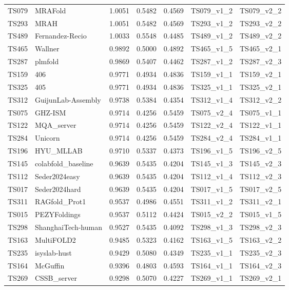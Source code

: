\begin{table}[ht]
{\begin{tabular}{llrrrll}
TS079 & MRAFold & 1.0051 & 0.5482 & 0.4569 & TS079\_v1\_2 & TS079\_v2\_2 \\ 
TS293 & MRAH & 1.0051 & 0.5482 & 0.4569 & TS293\_v1\_2 & TS293\_v2\_2 \\ 
TS489 & Fernandez-Recio & 1.0033 & 0.5548 & 0.4485 & TS489\_v1\_2 & TS489\_v2\_2 \\ 
TS465 & Wallner & 0.9892 & 0.5000 & 0.4892 & TS465\_v1\_5 & TS465\_v2\_1 \\ 
TS287 & plmfold & 0.9869 & 0.5407 & 0.4462 & TS287\_v1\_2 & TS287\_v2\_3 \\ 
TS159 & 406 & 0.9771 & 0.4934 & 0.4836 & TS159\_v1\_1 & TS159\_v2\_1 \\ 
TS325 & 405 & 0.9771 & 0.4934 & 0.4836 & TS325\_v1\_1 & TS325\_v2\_1 \\ 
TS312 & GuijunLab-Assembly & 0.9738 & 0.5384 & 0.4354 & TS312\_v1\_4 & TS312\_v2\_2 \\ 
TS075 & GHZ-ISM & 0.9714 & 0.4256 & 0.5459 & TS075\_v2\_4 & TS075\_v1\_1 \\ 
TS122 & MQA\_server & 0.9714 & 0.4256 & 0.5459 & TS122\_v2\_4 & TS122\_v1\_1 \\ 
TS284 & Unicorn & 0.9714 & 0.4256 & 0.5459 & TS284\_v2\_4 & TS284\_v1\_1 \\ 
TS196 & HYU\_MLLAB & 0.9710 & 0.5337 & 0.4373 & TS196\_v1\_5 & TS196\_v2\_5 \\ 
TS145 & colabfold\_baseline & 0.9639 & 0.5435 & 0.4204 & TS145\_v1\_3 & TS145\_v2\_3 \\ 
TS112 & Seder2024easy & 0.9639 & 0.5435 & 0.4204 & TS112\_v1\_4 & TS112\_v2\_3 \\ 
TS017 & Seder2024hard & 0.9639 & 0.5435 & 0.4204 & TS017\_v1\_5 & TS017\_v2\_5 \\ 
TS311 & RAGfold\_Prot1 & 0.9537 & 0.4986 & 0.4551 & TS311\_v1\_2 & TS311\_v2\_1 \\ 
TS015 & PEZYFoldings & 0.9537 & 0.5112 & 0.4424 & TS015\_v2\_2 & TS015\_v1\_5 \\ 
TS298 & ShanghaiTech-human & 0.9527 & 0.5435 & 0.4092 & TS298\_v1\_3 & TS298\_v2\_3 \\ 
TS163 & MultiFOLD2 & 0.9485 & 0.5323 & 0.4162 & TS163\_v1\_5 & TS163\_v2\_2 \\ 
TS235 & isyslab-hust & 0.9429 & 0.5080 & 0.4349 & TS235\_v1\_1 & TS235\_v2\_3 \\ 
TS164 & McGuffin & 0.9396 & 0.4803 & 0.4593 & TS164\_v1\_1 & TS164\_v2\_3 \\ 
TS269 & CSSB\_server & 0.9298 & 0.5070 & 0.4227 & TS269\_v1\_1 & TS269\_v2\_1 \\ 

\end{tabular}}
\end{table}
